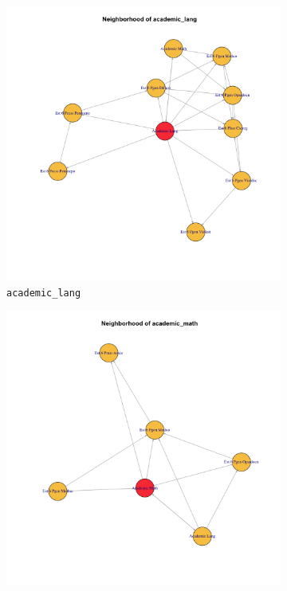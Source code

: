 \documentclass[11pt]{article}
\begin{document}
\begin{figure}[H]
  \centering
  \begin{subfigure}[b]{0.32\textwidth}
    \centering
    \includegraphics[width=\textwidth]{pc_estudiante_latent_academic_lang_neighborhood_m4.png}
    \caption{\texttt{academic\_lang}}
  \end{subfigure}
  \begin{subfigure}[b]{0.32\textwidth}
    \centering
    \includegraphics[width=\textwidth]{pc_estudiante_latent_academic_math_neighborhood_m4.png}

\end{subfigure}
\end{figure}
\end{document}
